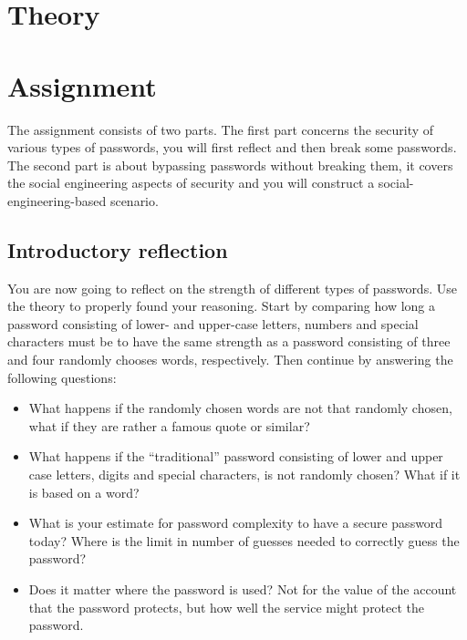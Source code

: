 \section{Theory}%
\label{sec:theory}




\section{Assignment}%
\label{sec:tasks}

The assignment consists of two parts.
The first part concerns the security of various types of passwords, you will 
first reflect and then break some passwords.
The second part is about bypassing passwords without breaking them, \ie it 
covers the social engineering aspects of security and you will construct a 
social-engineering-based scenario.

\subsection{Introductory reflection}%
\label{sec:reflection}

You are now going to reflect on the strength of different types of passwords.
Use the theory to properly found your reasoning.
Start by comparing how long a password consisting of lower- and upper-case 
letters, numbers and special characters must be to have the same strength as 
a password consisting of three and four randomly chooses words, respectively.
Then continue by answering the following questions:
\begin{itemize}
  \item What happens if the randomly chosen words are not that randomly chosen, 
    what if they are rather a famous quote or similar?

  \item What happens if the \enquote{traditional} password consisting of lower 
    and upper case letters, digits and special characters, is not randomly 
    chosen?
    What if it is based on a word?

  \item What is your estimate for password complexity to have a secure password 
    today?
    Where is the limit in number of guesses needed to correctly guess the 
    password?

  \item Does it matter where the password is used?
    Not for the value of the account that the password protects, but how well 
    the service might protect the password.
\end{itemize}

